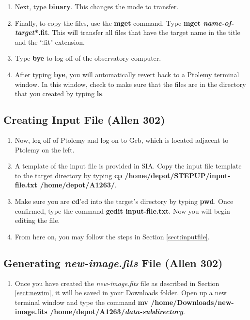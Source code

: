 \documentclass[11pt]{report}
\begin{document}
\begin{enumerate}
\item Next, type {\bf binary}. This changes the mode to transfer.
\item Finally, to copy the files, use the {\bf mget} command. Type {\bf mget \emph{name-of-target}*.fit}. This will transfer all files that have the target name in the title and the ``.fit" extension.
\item Type {\bf bye} to log off of the observatory computer.
\item After typing {\bf bye}, you will automatically revert back to a Ptolemy terminal window. In this window, check to make sure that the files are in the directory that you created by typing {\bf ls}.
\end{enumerate}

\subsection{Creating Input File (Allen 302)}
\begin{enumerate}
\item Now, log off of Ptolemy and log on to Geb, which is located adjacent to Ptolemy on the left.
\item A template of the input file is provided in SIA. Copy the input file template to the target directory by typing {\bf cp /home/depot/STEPUP/input-file.txt /home/depot/A1263/}. 
\item Make sure you are {\bf cd}'ed into the target's directory by typing \textbf{pwd}. Once confirmed, type the command {\bf gedit input-file.txt}. Now you will begin editing the file.
\item From here on, you may follow the steps in Section \ref{sect:inputfile}.
\end{enumerate}

\subsection{Generating \emph{new-image.fits} File (Allen 302)}
\label{sect:newim302}
\begin{enumerate}
\item Once you have created the \emph{new-image.fits} file as described in Section \ref{sect:newim}, it will be saved in your Downloads folder. Open up a new terminal window and type the command {\bf mv /home/Downloads/new-image.fits /home/depot/A1263/\emph{data-subdirectory}}.
\end{enumerate}
\end{document}
